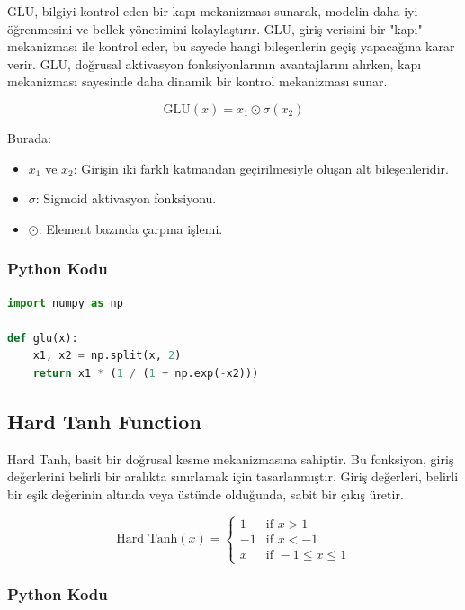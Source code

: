 GLU, bilgiyi kontrol eden bir kapı mekanizması sunarak, modelin daha iyi öğrenmesini ve bellek yönetimini kolaylaştırır. GLU, giriş verisini bir "kapı" mekanizması ile kontrol eder, bu sayede hangi bileşenlerin geçiş yapacağına karar verir. GLU, doğrusal aktivasyon fonksiyonlarının avantajlarını alırken, kapı mekanizması sayesinde daha dinamik bir kontrol mekanizması sunar.

\[ \text{GLU}(x) = x_1 \odot \sigma(x_2) \]

Burada: 

\begin{itemize}
    \item $x_1$ ve $x_2$: Girişin iki farklı katmandan geçirilmesiyle oluşan alt bileşenleridir.
    \item $\sigma$: Sigmoid aktivasyon fonksiyonu.
    \item $\odot$: Element bazında çarpma işlemi.
\end{itemize}

\subsubsection{Python Kodu}

\begin{lstlisting}[language=Python]
import numpy as np

def glu(x):
    x1, x2 = np.split(x, 2)
    return x1 * (1 / (1 + np.exp(-x2)))
\end{lstlisting}

\newpage

\subsection{Hard Tanh Function}

Hard Tanh, basit bir doğrusal kesme mekanizmasına sahiptir. Bu fonksiyon, giriş değerlerini belirli bir aralıkta sınırlamak için tasarlanmıştır. Giriş değerleri, belirli bir eşik değerinin altında veya üstünde olduğunda, sabit bir çıkış üretir.

\[
\text{Hard Tanh}(x) = 
\begin{cases} 
1 & \text{if } x > 1 \\ 
-1 & \text{if } x < -1 \\ 
x & \text{if } -1 \leq x \leq 1 
\end{cases}
\]

\subsubsection{Python Kodu}

